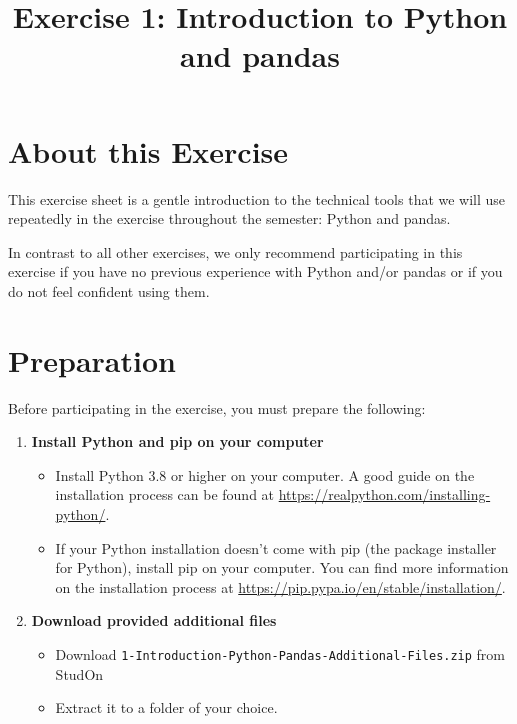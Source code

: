 \documentclass[
english,
smallborders
]{../i6prcsht}
\begin{document}
\title{Exercise 1: Introduction to Python and pandas}
\maketitle

\section*{About this Exercise}

This exercise sheet is a gentle introduction to the technical tools that we will use repeatedly in the exercise throughout the semester: Python and pandas.

In contrast to all other exercises, we only recommend participating in this exercise if you have no previous experience with Python and/or pandas or if you do not feel confident using them.

\section*{Preparation}

Before participating in the exercise, you must prepare the following:

\begin{enumerate}
	\item \textbf{Install Python and pip on your computer}

	      \begin{itemize}
		      \item Install Python 3.8 or higher on your computer.
		            A good guide on the installation process can be found at \url{https://realpython.com/installing-python/}.
		      \item If your Python installation doesn't come with pip (the package installer for Python), install pip on your computer.
		            You can find more information on the installation process at \url{https://pip.pypa.io/en/stable/installation/}.
	      \end{itemize}

	\item \textbf{Download provided additional files}

	      \begin{itemize}
		      \item Download \texttt{1-Introduction-Python-Pandas-Additional-Files.zip} from StudOn
		      \item Extract it to a folder of your choice.
	      \end{itemize}

\end{enumerate}
\end{document}
